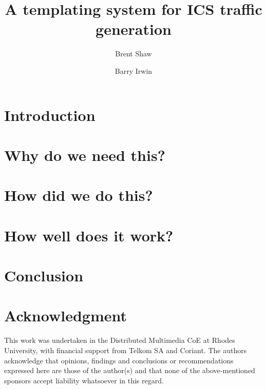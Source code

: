 \documentclass[runningheads]{llncs}
\begin{document}
\title{A templating system for ICS traffic generation}

\author{Brent Shaw \and
Barry Irwin}

\maketitle

\begin{abstract}

\end{abstract}


\section{Introduction}

\section{Why do we need this?}

\section{How did we do this?}

\section{How well does it work?}

\section{Conclusion}

\section*{Acknowledgment}
This work was undertaken in the Distributed Multimedia CoE at Rhodes University, with financial support from Telkom SA and Coriant. The authors acknowledge that opinions, findings and conclusions or recommendations expressed here are those of the author(s) and that none of the above-mentioned sponsors accept liability whatsoever in this regard. \cite{Atzori20102787}



\end{document}
